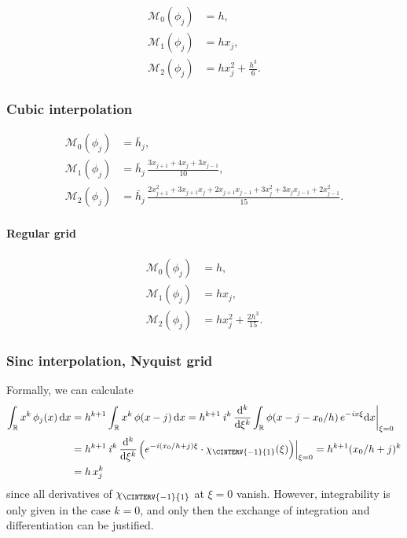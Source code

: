 \documentclass[a4paper]{paper}
\newcommand{\RR}{{\ensuremath{\mathbb{R}}}}
\newcommand*{\OP}[1]{{\ensuremath{\mathcal{#1}}}}
\newcommand*{\OPM}{\OP{M}}
\newcommand*{\FUNCRESTR}[2]{{\ensuremath{\left. \vphantom{g_{g_g}} {#1} \right|_{#2}}}}
\newcommand*{\I}{\ensuremath{\mathit{i}}}
\newcommand*{\D}{{\ensuremath{\mathrm{d}}}}
\begin{document}
\begin{align*}
 \OPM_0(\phi_j) &= h, \\
 \OPM_1(\phi_j) &= h x_j, \\
 \OPM_2(\phi_j) &= h x_j^2 +  \frac{h^3}{6}.
\end{align*}


\subsubsection{Cubic interpolation}
\label{subsubsec:specif:moments:cubic}

\begin{align*}
 \OPM_0(\phi_j) &= \bar h_j, \\
 \OPM_1(\phi_j) &= \bar h_j\, \frac{3x_{j+1} + 4x_j + 3x_{j-1}}{10}, \\
 \OPM_2(\phi_j) &= \bar h_j\, \frac{2x_{j+1}^2 + 3x_{j+1}x_j + 2x_{j+1}x_{j-1} + 3x_j^2 + 3x_jx_{j-1} + 2x_{j-1}^2}{15}.
\end{align*}

\paragraph{Regular grid}

\begin{align*}
 \OPM_0(\phi_j) &= h, \\
 \OPM_1(\phi_j) &= h x_j, \\
 \OPM_2(\phi_j) &= h x_j^2 +  \frac{2h^3}{15}.
\end{align*}


\subsubsection{Sinc interpolation, Nyquist grid}
\label{subsubsec:specif:moments:sinc}

Formally, we can calculate
%
\begin{align*}
 \int_\RR x^k\, \phi_j(x)\, \D x 
 &= h^{k+1} \int_\RR x^k\, \phi(x-j)\, \D x 
 = h^{k+1}\, \I^k\, \frac{\D^k}{\D\xi^k} \FUNCRESTR{\int_\RR \phi(x-j-x_0/h)\, e^{-\I x \xi} \D x}{\xi=0} \\
 &= h^{k+1}\, \I^k\, \frac{\D^k}{\D\xi^k} \FUNCRESTR{\Big( e^{-\I (x_0/h + j) \xi} \cdot \chi_{\CINTERV{-1}{1}}(\xi) 
 \Big)}{\xi=0}
 = h^{k+1} (x_0/h + j)^k \\
 &= h\, x_j^k
\end{align*}
%
since all derivatives of $\chi_{\CINTERV{-1}{1}}$ at $\xi=0$ vanish. However, integrability is only given in the case 
$k=0$, and only then the exchange of integration and differentiation can be justified.
\end{document}

